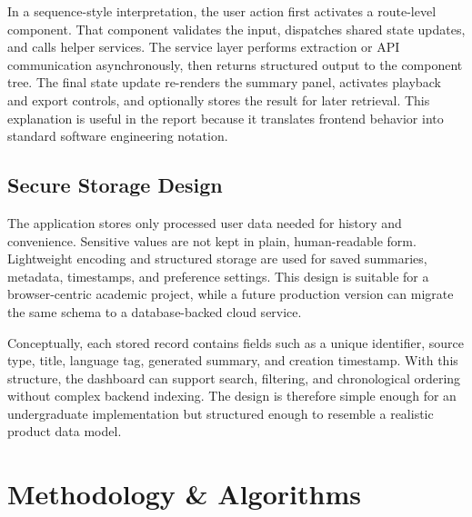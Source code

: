 \documentclass[12pt, a4paper]{report}
\begin{document}
In a sequence-style interpretation, the user action first activates a route-level component. That component validates the input, dispatches shared state updates, and calls helper services. The service layer performs extraction or API communication asynchronously, then returns structured output to the component tree. The final state update re-renders the summary panel, activates playback and export controls, and optionally stores the result for later retrieval. This explanation is useful in the report because it translates frontend behavior into standard software engineering notation.

\section{Secure Storage Design}
The application stores only processed user data needed for history and convenience. Sensitive values are not kept in plain, human-readable form. Lightweight encoding and structured storage are used for saved summaries, metadata, timestamps, and preference settings. This design is suitable for a browser-centric academic project, while a future production version can migrate the same schema to a database-backed cloud service.

Conceptually, each stored record contains fields such as a unique identifier, source type, title, language tag, generated summary, and creation timestamp. With this structure, the dashboard can support search, filtering, and chronological ordering without complex backend indexing. The design is therefore simple enough for an undergraduate implementation but structured enough to resemble a realistic product data model.



\chapter{Methodology \& Algorithms}

\end{document}
